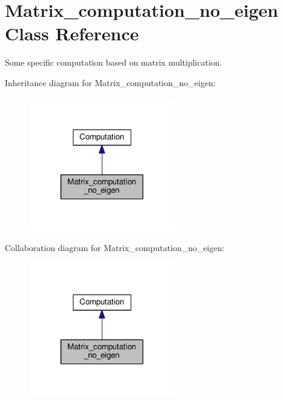 \hypertarget{classMatrix__computation__no__eigen}{}\section{Matrix\+\_\+computation\+\_\+no\+\_\+eigen Class Reference}
\label{classMatrix__computation__no__eigen}


Some specific computation based on matrix multiplication.  




Inheritance diagram for Matrix\+\_\+computation\+\_\+no\+\_\+eigen\+:
\nopagebreak
\begin{figure}[H]
\begin{center}
\leavevmode
\includegraphics[width=182pt]{classMatrix__computation__no__eigen__inherit__graph}
\end{center}
\end{figure}


Collaboration diagram for Matrix\+\_\+computation\+\_\+no\+\_\+eigen\+:
\nopagebreak
\begin{figure}[H]
\begin{center}
\leavevmode
\includegraphics[width=182pt]{classMatrix__computation__no__eigen__coll__graph}
\end{center}
\end{figure}
